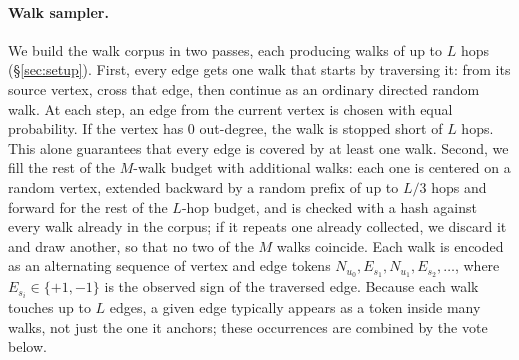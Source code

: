 \documentclass[sigconf, review, anonymous]{acmart}
\theoremstyle{plain}
\theoremstyle{definition}
\begin{document}
\paragraph{Walk sampler.} We build the walk corpus in two passes, each producing walks of up to $L$ hops (\S\ref{sec:setup}). First, every edge gets one walk that starts by traversing it: from its source vertex, cross that edge, then continue as an ordinary directed random walk. At each step, an edge from the current vertex is chosen with equal probability. If the vertex has 0 out-degree, the walk is stopped short of $L$ hops. This alone guarantees that every edge is covered by at least one walk. Second, we fill the rest of the $M$-walk budget with additional walks: each one is centered on a random vertex, extended backward by a random prefix of up to $L/3$ hops and forward for the rest of the $L$-hop budget, and is checked with a hash against every walk already in the corpus; if it repeats one already collected, we discard it and draw another, so that no two of the $M$ walks coincide. Each walk is encoded as an alternating sequence of vertex and edge tokens $N_{u_0}, E_{s_1}, N_{u_1}, E_{s_2}, \ldots$, where $E_{s_i}\in\{+1,-1\}$ is the observed sign of the traversed edge. Because each walk touches up to $L$ edges, a given edge typically appears as a token inside many walks, not just the one it anchors; these occurrences are combined by the vote below.
\end{document}
